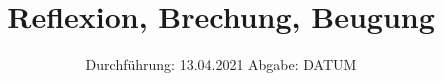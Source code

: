 

\subject{V400}
\title{Reflexion, Brechung, Beugung}
\date{%
  Durchführung: 13.04.2021
  \hspace{3em}
  Abgabe: DATUM
}



\maketitle
\thispagestyle{empty}
\tableofcontents
\newpage







\printbibliography{}


